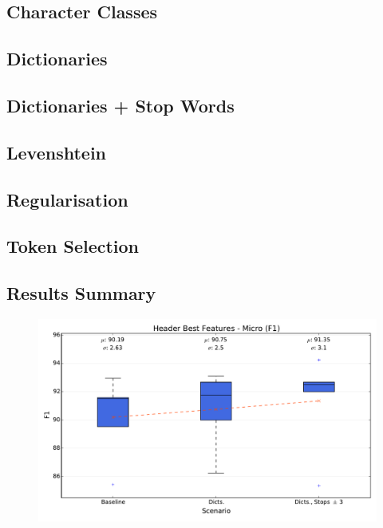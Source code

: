 \subsection{Character Classes}

\subsection{Dictionaries}

\subsection{Dictionaries + Stop Words}

\subsection{Levenshtein}

\subsection{Regularisation}

\subsection{Token Selection}

\subsection{Results Summary}

\begin{figure}[h]
\center
\includegraphics[width=5.5in]{Figures/micro.pdf}
\caption{}
\label{fig:micro}
\end{figure}

